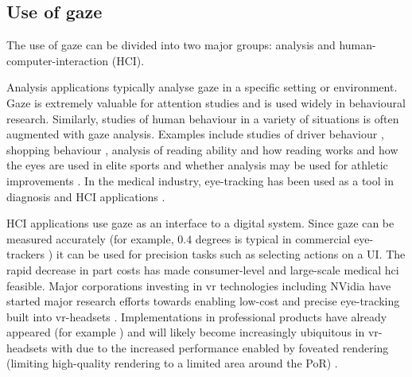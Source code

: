 \subsection{Use of gaze}
The use of gaze can be divided into two major groups: analysis and human-computer-interaction (HCI). 

Analysis applications typically analyse gaze in a specific setting or environment. Gaze is extremely valuable for attention studies and is used widely in behavioural research. Similarly, studies of human behaviour in a variety of situations is often augmented with gaze analysis. Examples include studies of driver behaviour \parencite{yoshizawa2017analysis}, shopping behaviour \parencite{bialkova2020desktop}, analysis of reading ability and how reading works \parencite{holsanova2006entry} and how the eyes are used in elite sports and whether analysis may be used for athletic improvements \parencite{biathlon}. In the medical industry, eye-tracking has been used as a tool in diagnosis and HCI applications \parencite{jayanthi2010automatic, holzman1974eye, galgani2009automatic}. 

HCI applications use gaze as an interface to a digital system. Since gaze can be measured accurately (for example, $0.4$ degrees is typical in commercial eye-trackers \parencite{toby-spec}) it can be used for precision tasks such as selecting actions on a UI. The rapid decrease in part costs has made consumer-level and large-scale medical \acrlong{hci} feasible. Major corporations investing in \acrfull{vr} technologies including NVidia have started major research efforts towards enabling low-cost and precise eye-tracking built into \acrshort{vr}-headsets \parencite{nvidia-foveated}. Implementations in professional products have already appeared (for example \parencite{vive-eye}) and will likely become increasingly ubiquitous in \acrshort{vr}-headsets with due to the increased performance enabled by foveated rendering (limiting high-quality rendering to a limited area around the PoR) \parencite{nvidia-foveated}.


